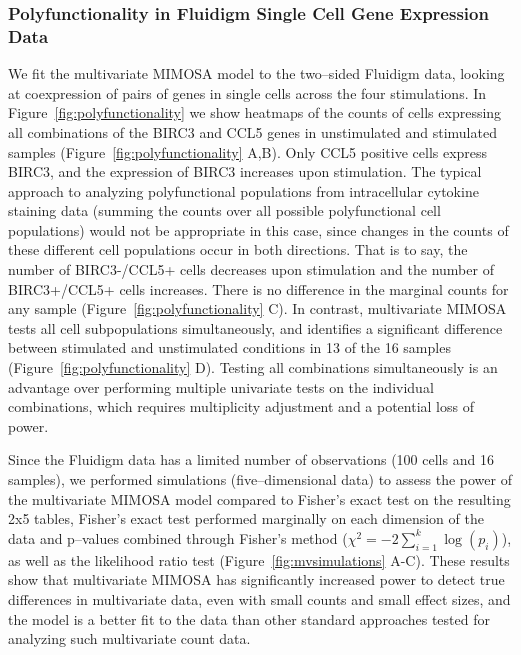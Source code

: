 \documentclass[11pt]{article}
\begin{document}
\subsubsection{Polyfunctionality in Fluidigm Single Cell Gene Expression Data}
We fit the multivariate MIMOSA model to the two--sided Fluidigm data, looking at coexpression of pairs of genes in single cells across the four stimulations. In Figure~\ref{fig:polyfunctionality} we show heatmaps of the counts of cells expressing all combinations of the BIRC3 and CCL5 genes in unstimulated and stimulated samples (Figure~\ref{fig:polyfunctionality} A,B). Only CCL5 positive cells express BIRC3, and the expression of BIRC3 increases upon stimulation. The typical approach to analyzing polyfunctional populations from intracellular cytokine staining data (summing the counts over all possible polyfunctional cell populations) would not be appropriate in this case, since changes in the counts of these different cell populations occur in both directions. That is to say, the number of BIRC3-/CCL5+ cells decreases upon stimulation and the number of BIRC3+/CCL5+ cells increases. There is no difference in the marginal counts for any sample (Figure~\ref{fig:polyfunctionality} C). In contrast, multivariate MIMOSA tests all cell subpopulations simultaneously, and identifies a significant difference between stimulated and unstimulated conditions in 13 of the 16 samples (Figure~\ref{fig:polyfunctionality} D). Testing all combinations simultaneously is an advantage over performing multiple univariate tests on the individual combinations, which requires multiplicity adjustment and a potential loss of power. 

Since the Fluidigm data has a limited number of observations (100 cells and 16 samples), we performed simulations (five--dimensional data) to assess the power of the multivariate MIMOSA  model compared to Fisher's exact test on the resulting 2x5 tables, Fisher's exact test performed marginally on each dimension of the data and p--values combined through Fisher's method ($\chi^2=-2\sum_{i=1}^k\log(p_i)$), as well as the likelihood ratio test (Figure~\ref{fig:mvsimulations} A-C). These results show that multivariate MIMOSA has significantly increased power to detect true differences in multivariate data, even with small counts and small effect sizes, and the model is a better fit to the data than other standard approaches tested for analyzing such multivariate count data. 
\end{document}
